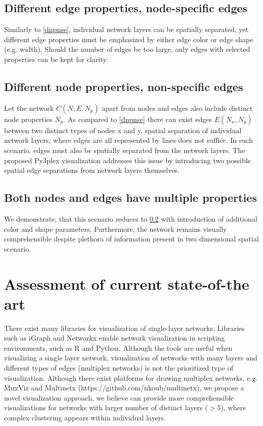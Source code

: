 \subsection{Different edge properties, node-specific edges}
Similarly to \ref{dnpnse}, individual network layers can be spatially separated, yet different edge properties must be emphasized by either edge color or edge shape (e.g. width). Should the number of edges be too large, only edges with selected properties can be kept for clarity.

\subsection{Different node properties, non-specific edges}
\label{proposition}
Let the network $C(N,E,N_{p})$ apart from nodes and edges also include distinct node properties $N_{p}$. As compared to \ref{dnpnse} there can exist edges $E(N_{x},N_{y})$ between two distinct types of nodes x and y,  spatial separation of individual network layers, where edges are all represented by lines does not suffice. In such scenario, edges must also be spatially separated from the network layers. The proposed Py3plex visualization addresses this issue by introducing two possible spatial edge separations from network layers themselves.

\subsection{Both nodes and edges have multiple properties}
We demonstrate, that this scenario reduces to \ref{proposition} with introduction of additional color and shape parameters. Furthermore, the network remains visually comprehensible despite plethora of information present in two dimensional spatial scenario.

\section{Assessment of current state-of-the art}
There exist many libraries for visualization of single-layer networks. Libraries such as iGraph \cite{csardi2006igraph} and Networkx \cite{hagberg2008exploring} enable network visualization in scripting environments, such as R and Python. Although the tools are useful when visualizing a single layer network, visualization of networks with many layers and different types of edges (multiplex networks) is not the prioritized type of visualization. Although there exist platforms for drawing multiplex networks, e.g. MuxViz \cite{de2014muxviz} and Multinetx (https://github.com/nkoub/multinetx), we propose a novel visualization approach, we believe can provide more comprehensible visualizations for networks with larger number of distinct layers ($>5$), where complex clustering appears within individual layers.

